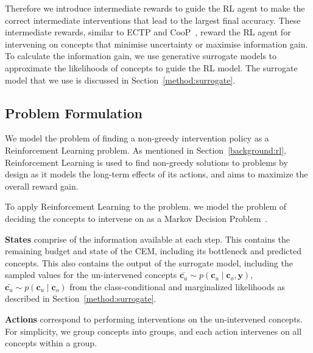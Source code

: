 Therefore we introduce intermediate rewards 
to guide the RL agent to make the correct intermediate
interventions that lead 
to the largest final accuracy.
These intermediate rewards, similar to ECTP and CooP~\cite{coop, ectp}, reward the RL agent for 
intervening on concepts that minimise uncertainty or maximise information gain. To calculate the information gain,
we use generative surrogate models
to approximate the likelihoods of concepts
to guide the RL model. The surrogate model that we 
use is discussed in Section~\ref{method:surrogate}.

\subsection{Problem Formulation}

We model the problem of finding a non-greedy intervention policy as a 
Reinforcement Learning problem. As mentioned in Section~\ref{background:rl},
Reinforcement Learning is used to find non-greedy solutions to problems
by design as it models the long-term effects of its actions, and aims to 
maximize the overall reward gain. 

To apply Reinforcement Learning to the problem. we model the problem
of deciding the concepts to intervene on
as a Markov Decision Problem~\cite{rl-mdp}.

\textbf{States} comprise of the information available
    at each step. This contains the remaining budget and 
    state of the CEM, including its bottleneck and predicted concepts.
    This also contains the output of the surrogate model, 
    including the sampled values for the un-intervened concepts 
    $\bar{\mathbf{c}_u} \sim p(\mathbf{c}_u \mid \mathbf{c}_o, \mathbf{y})$,
    $\bar{\mathbf{c}_u} \sim p(\mathbf{c}_u \mid \mathbf{c}_o)$
    from the class-conditional and marginalized likelihoods
    as described in Section~\ref{method:surrogate}.

\textbf{Actions} correspond to performing interventions 
on the un-intervened concepts.
For simplicity, we group concepts into groups, and each action intervenes on all concepts
within a group.

